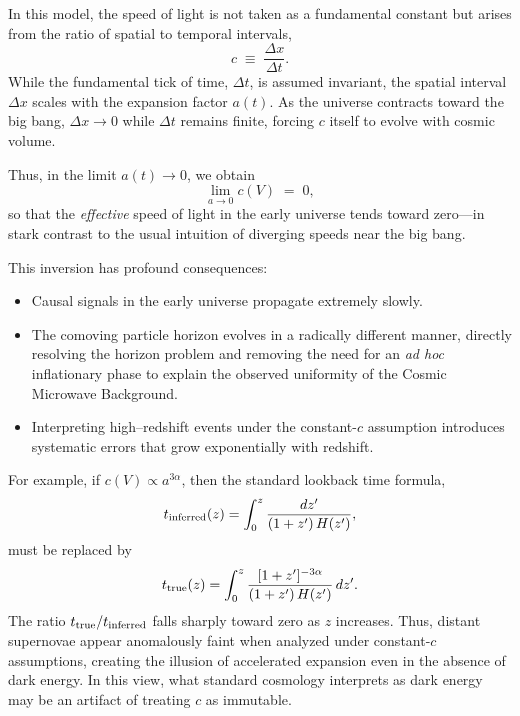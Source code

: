 \documentclass[12pt]{article}
\begin{document}
In this model, the speed of light is not taken as a fundamental constant but arises from the ratio of spatial to temporal intervals,
\begin{equation}
c \;\equiv\; \frac{\Delta x}{\Delta t}.
\end{equation}
While the fundamental tick of time, $\Delta t$, is assumed invariant, the spatial interval $\Delta x$ scales with the expansion factor $a(t)$. 
As the universe contracts toward the big bang, $\Delta x \to 0$ while $\Delta t$ remains finite, forcing $c$ itself to evolve with cosmic volume. 

Thus, in the limit $a(t) \to 0$, we obtain
\begin{equation}
\lim_{a\to 0} c(V) \;=\; 0,
\end{equation}
so that the \emph{effective} speed of light in the early universe tends toward zero---in stark contrast to the usual intuition of diverging speeds near the big bang.

This inversion has profound consequences:
\begin{itemize}
\item Causal signals in the early universe propagate extremely slowly.  
\item The comoving particle horizon evolves in a radically different manner, directly resolving the horizon problem and removing the need for an \emph{ad hoc} inflationary phase to explain the observed uniformity of the Cosmic Microwave Background.  
\item Interpreting high--redshift events under the constant-$c$ assumption introduces systematic errors that grow exponentially with redshift.  
\end{itemize}

For example, if $c(V) \propto a^{3\alpha}$, then the standard lookback time formula,
\begin{equation}
t_{\rm inferred}(z) = \int_0^z \frac{dz'}{(1+z')\, H(z')},
\end{equation}
must be replaced by
\begin{equation}
t_{\rm true}(z) = \int_0^z \frac{[1+z']^{-3\alpha}}{(1+z')\, H(z')} \, dz' .
\end{equation}
The ratio $t_{\rm true}/t_{\rm inferred}$ falls sharply toward zero as $z$ increases.  
Thus, distant supernovae appear anomalously faint when analyzed under constant-$c$ assumptions, creating the illusion of accelerated expansion even in the absence of dark energy.  
In this view, what standard cosmology interprets as dark energy may be an artifact of treating $c$ as immutable.  
\end{document}
